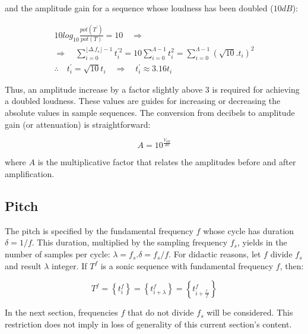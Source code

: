 \noindent and the amplitude gain for a sequence whose loudness has been doubled ($10dB$):

\begin{equation}\label{eq:dobraVol}
\begin{split}
10log_{10}\frac{pot(T^{'})}{pot(T)} = 10 \quad \Rightarrow \\ \Rightarrow \quad \sum_{i=0}^{\lfloor \Delta.f_s \rfloor -1}t^{'2}_i=10\sum_{i=0}^{\Lambda-1}t_i^2=\sum_{i=0}^{\Lambda-1}(\sqrt{10}.t_i)^2 \\
\therefore \quad t^{'}_i=\sqrt{10}t_i \quad \Rightarrow \quad t^{'}_i \approx 3.16t_i
\end{split}
\end{equation}

Thus, an amplitude increase by a factor slightly above 3 is required for achieving a doubled loudness.
These values are guides for increasing or decreasing the absolute values in sample sequences.
The conversion from decibels to amplitude gain (or attenuation) is straightforward:

\begin{equation}\label{ampDec}
A = 10^{\frac{V_{dB}}{20}}
\end{equation}

\noindent where $A$ is the multiplicative factor that relates the amplitudes before and after amplification.

\subsection{Pitch}
The pitch is specified by the fundamental frequency $f$ whose cycle has duration $\delta=1/f$.
This duration, multiplied by the sampling frequency $f_s$, yields in the number of samples per cycle: $\lambda=f_s . \delta =f_s/f$.
For didactic reasons, let $f$ divide $f_s$ and result $\lambda$ integer. If $T^f$ is a sonic sequence with fundamental frequency $f$, then:

\begin{equation}\label{periodicidade}
     T^f=\left\{ t_i^f \right\}=\left\{ t^f_{i+\lambda}  \right\}= \left\{ t^f_{i+\frac{f_s}{f}} \right\}
\end{equation}

In the next section, frequencies $f$ that do not divide $f_s$ will be considered. This restriction does not imply in loss of generality of this current section's content.

